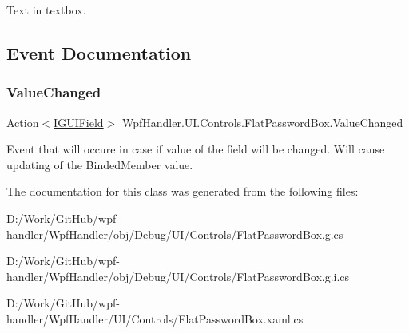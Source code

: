 Text in textbox. 



\subsection{Event Documentation}
\mbox{\label{class_wpf_handler_1_1_u_i_1_1_controls_1_1_flat_password_box_a9f85bdb8d3cf805ee1bc3d1d1580c176}} 
\subsubsection{\texorpdfstring{Value\+Changed}{ValueChanged}}
{\footnotesize\ttfamily Action$<$\mbox{\hyperlink{interface_wpf_handler_1_1_u_i_1_1_auto_layout_1_1_i_g_u_i_field}{I\+G\+U\+I\+Field}}$>$ Wpf\+Handler.\+U\+I.\+Controls.\+Flat\+Password\+Box.\+Value\+Changed}



Event that will occure in case if value of the field will be changed. Will cause updating of the Binded\+Member value. 



The documentation for this class was generated from the following files\+:\begin{DoxyCompactItemize}
\item 
D\+:/\+Work/\+Git\+Hub/wpf-\/handler/\+Wpf\+Handler/obj/\+Debug/\+U\+I/\+Controls/Flat\+Password\+Box.\+g.\+cs\item 
D\+:/\+Work/\+Git\+Hub/wpf-\/handler/\+Wpf\+Handler/obj/\+Debug/\+U\+I/\+Controls/Flat\+Password\+Box.\+g.\+i.\+cs\item 
D\+:/\+Work/\+Git\+Hub/wpf-\/handler/\+Wpf\+Handler/\+U\+I/\+Controls/Flat\+Password\+Box.\+xaml.\+cs\end{DoxyCompactItemize}
